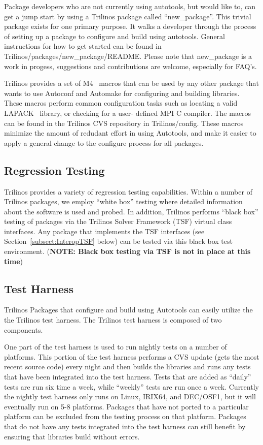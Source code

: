 \documentclass[12pt,relax]{TrilinosDevGuide}
\begin{document}
Package developers who are not currently using autotools, but would like
to, can get a jump start by using a Trilinos package called 
``new\_package''.  This trivial package exists for one primary purpose.  
It walks a developer through the process of setting up a package to 
configure and build using autotools.  General instructions for how to get 
started can be found in Trilinos/packages/new\_package/README.  Please note 
that new\_package is a work in progess, suggestions and contributions are 
welcome, especially for FAQ's.

Trilinos provides a set of M4~\cite{M4} macros that can be used by any other
package that wants to use Autoconf and Automake for configuring and
building libraries.  These macros perform common configuration tasks such as
locating a valid LAPACK~\cite{lapack} library, or checking for a user-
defined MPI C compiler.  The macros can be found in the Trilinos CVS 
repository in Trilinos/config.  These macros minimize the amount of redudant
 effort in using Autotools, and make it easier to apply a general change to 
the configure process for all packages.
\subsection{Regression Testing}
Trilinos provides a variety of regression
testing capabilities.  Within a number of Trilinos packages, we employ
``white box'' testing where detailed information about the software is
used and probed.  In addition, Trilinos performs ``black box'' testing
of packages via the Trilinos Solver Framework (TSF) virtual class
interfaces.  Any package that implements the TSF interfaces (see
Section~\ref{subsect:InteropTSF} below)
can be tested via this black box
test environment.  ({\bf NOTE: Black box testing via TSF is not in
place at this time})
	\subsection{Test Harness}
Trilinos Packages that configure and build using Autotools can easily 
utilize the the Trilinos test harness.  The Trilinos test harness is composed 
of two components.  

One part of the test harness is used to run nightly tests 
on a number of platforms.  This portion of the test harness performs a CVS 
update (gets the most recent source code) every night and then builds the 
libraries and runs any tests that have been integrated into the test harness.  
Tests that are added as ``daily'' tests are run six time a week, while 
``weekly'' tests are run once a week.  Currently the nightly test harness only 
runs on Linux, IRIX64, and DEC/OSF1, but it will eventually run on 5-8 
platforms.  Packages that have not ported to a particular platform can be 
excluded from the testing process on that platform.  Packages that do not have 
any tests integrated into the test harness can still benefit by ensuring that 
libraries build without errors.  
\end{document}
